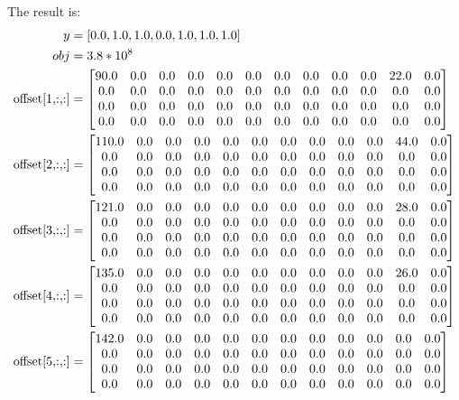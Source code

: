 \documentclass[fleqn,10pt]{wlscirep}
\begin{document}
The result is:
\begin{align}
    y &= [0.0, 1.0, 1.0, 0.0, 1.0, 1.0, 1.0] \\
    obj &= 3.8 * 10^8 \\
    \text{offset[1,:,:]} &= {
    \setcounter{MaxMatrixCols}{20}
    \begin{bmatrix}
    90.0 &0.0 &0.0 &0.0 &0.0 &0.0 &0.0 &0.0 &0.0 &0.0 &22.0 &0.0 \\ 
    0.0 &0.0 &0.0 &0.0 &0.0 &0.0 &0.0 &0.0 &0.0 &0.0 &0.0 &0.0 \\ 
    0.0 &0.0 &0.0 &0.0 &0.0 &0.0 &0.0 &0.0 &0.0 &0.0 &0.0 &0.0 \\ 
    0.0 &0.0 &0.0 &0.0 &0.0 &0.0 &0.0 &0.0 &0.0 &0.0 &0.0 &0.0
    \end{bmatrix}
    }%
    \\ \text{offset[2,:,:]} &= {
    \setcounter{MaxMatrixCols}{20}
    \begin{bmatrix}
    110.0 &0.0 &0.0 &0.0 &0.0 &0.0 &0.0 &0.0 &0.0 &0.0 &44.0 &0.0 \\ 
    0.0 &0.0 &0.0 &0.0 &0.0 &0.0 &0.0 &0.0 &0.0 &0.0 &0.0 &0.0 \\ 
    0.0 &0.0 &0.0 &0.0 &0.0 &0.0 &0.0 &0.0 &0.0 &0.0 &0.0 &0.0 \\ 
    0.0 &0.0 &0.0 &0.0 &0.0 &0.0 &0.0 &0.0 &0.0 &0.0 &0.0 &0.0
    \end{bmatrix}
    }%
    \\ \text{offset[3,:,:]} &= {
    \setcounter{MaxMatrixCols}{20}
    \begin{bmatrix}
    121.0 &0.0 &0.0 &0.0 &0.0 &0.0 &0.0 &0.0 &0.0 &0.0 &28.0 &0.0 \\ 
    0.0 &0.0 &0.0 &0.0 &0.0 &0.0 &0.0 &0.0 &0.0 &0.0 &0.0 &0.0 \\ 
    0.0 &0.0 &0.0 &0.0 &0.0 &0.0 &0.0 &0.0 &0.0 &0.0 &0.0 &0.0 \\ 
    0.0 &0.0 &0.0 &0.0 &0.0 &0.0 &0.0 &0.0 &0.0 &0.0 &0.0 &0.0
    \end{bmatrix}
    }%
    \\ \text{offset[4,:,:]} &= {
    \setcounter{MaxMatrixCols}{20}
    \begin{bmatrix}
    135.0 &0.0 &0.0 &0.0 &0.0 &0.0 &0.0 &0.0 &0.0 &0.0 &26.0 &0.0 \\ 
    0.0 &0.0 &0.0 &0.0 &0.0 &0.0 &0.0 &0.0 &0.0 &0.0 &0.0 &0.0 \\ 
    0.0 &0.0 &0.0 &0.0 &0.0 &0.0 &0.0 &0.0 &0.0 &0.0 &0.0 &0.0 \\ 
    0.0 &0.0 &0.0 &0.0 &0.0 &0.0 &0.0 &0.0 &0.0 &0.0 &0.0 &0.0
    \end{bmatrix}
    }%
    \\ \text{offset[5,:,:]} &= {
    \setcounter{MaxMatrixCols}{20}
    \begin{bmatrix}
    142.0 &0.0 &0.0 &0.0 &0.0 &0.0 &0.0 &0.0 &0.0 &0.0 &0.0 &0.0 \\ 
    0.0 &0.0 &0.0 &0.0 &0.0 &0.0 &0.0 &0.0 &0.0 &0.0 &0.0 &0.0 \\ 
    0.0 &0.0 &0.0 &0.0 &0.0 &0.0 &0.0 &0.0 &0.0 &0.0 &0.0 &0.0 \\ 
    0.0 &0.0 &0.0 &0.0 &0.0 &0.0 &0.0 &0.0 &0.0 &0.0 &0.0 &0.0
    \end{bmatrix}
    }%
\end{align}
\end{document}
